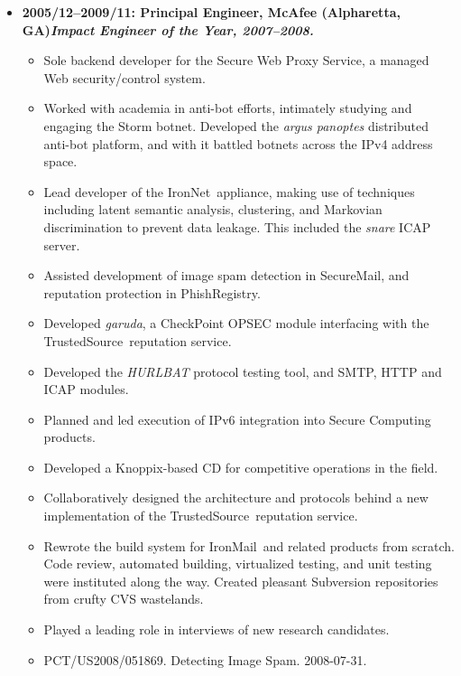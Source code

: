 \documentclass{article}
\newenvironment{tightitemize}
{\begin{itemize}
  \setlength{\itemsep}{1pt}
  \setlength{\parskip}{0pt}
  \setlength{\parsep}{0pt}}
{\end{itemize}}
\begin{document}
\begin{tightitemize}
\item \textbf{2005/12--2009/11: Principal Engineer, McAfee (Alpharetta, GA)\hfill \tiny{\textit{Impact Engineer of the Year, 2007--2008.}}}
\begin{tightitemize}
\item Sole backend developer for the Secure Web Proxy Service, a managed Web
  security/control system.
\item Worked with academia in anti-bot efforts, intimately studying and engaging
  the Storm botnet. Developed the \textit{argus panoptes} distributed anti-bot
  platform, and with it battled botnets across the IPv4 address space.
\item Lead developer of the IronNet\texttrademark\ appliance, making use of techniques
  including latent semantic analysis, clustering, and Markovian discrimination
  to prevent data leakage. This included the \textit{snare} ICAP server.
\item Assisted development of image spam detection in SecureMail\texttrademark, and
  reputation protection in PhishRegistry\texttrademark.
\item Developed \textit{garuda}, a CheckPoint\textsuperscript{\textregistered} OPSEC module interfacing with the
  TrustedSource\texttrademark\ reputation service.
\item Developed the \textit{HURLBAT} protocol testing tool, and SMTP, HTTP and ICAP modules.
\item Planned and led execution of IPv6 integration into Secure Computing products.
\item Developed a Knoppix\textsuperscript{\textregistered}-based CD for competitive operations in the field.
\item Collaboratively designed the architecture and protocols behind a new
  implementation of the TrustedSource\texttrademark\ reputation service.
\item Rewrote the build system for IronMail\texttrademark\ and related products from scratch.
  Code review, automated building, virtualized testing, and unit testing were
  instituted along the way. Created pleasant Subversion repositories from
  crufty CVS wastelands.
\item Played a leading role in interviews of new research candidates.
\item PCT/US2008/051869. Detecting Image Spam. 2008-07-31.\hfill{}\\
\end{tightitemize}


\end{tightitemize}
\end{document}
